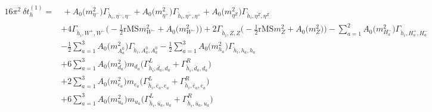 \begin{align} 
16\pi^2 \ \delta t^{(1)}_{h} = & \, +{A_0\Big(m^2_{\eta^-}\Big)} {\Gamma_{\check{h}_{{i}},\bar{\eta^-},\eta^-}} +{A_0\Big(m^2_{\eta^+}\Big)} {\Gamma_{\check{h}_{{i}},\bar{\eta^+},\eta^+}} +{A_0\Big(m^2_{\eta^Z}\Big)} {\Gamma_{\check{h}_{{i}},\bar{\eta^Z},\eta^Z}} \nonumber \\ 
 &+4 {\Gamma_{\check{h}_{{i}},W^+,W^-}} \Big(-\frac{1}{2} \text{rMS} m^2_{W^-}  + {A_0\Big(m^2_{W^-}\Big)}\Big)+2 {\Gamma_{\check{h}_{{i}},Z,Z}} \Big(-\frac{1}{2} \text{rMS} m^2_{Z}  + {A_0\Big(m^2_{Z}\Big)}\Big)- \sum_{a=1}^{2}{A_0\Big(m^2_{H^-_{{a}}}\Big)} {\Gamma_{\check{h}_{{i}},H^+_{{a}},H^-_{{a}}}}  \nonumber \\ 
 &-\frac{1}{2} \sum_{a=1}^{3}{A_0\Big(m^2_{A^0_{{a}}}\Big)} {\Gamma_{\check{h}_{{i}},A^0_{{a}},A^0_{{a}}}}  -\frac{1}{2} \sum_{a=1}^{3}{A_0\Big(m^2_{h_{{a}}}\Big)} {\Gamma_{\check{h}_{{i}},h_{{a}},h_{{a}}}}  \nonumber \\ 
 &+6 \sum_{a=1}^{3}{A_0\Big(m^2_{d_{{a}}}\Big)} m_{d_{{a}}} \Big({\Gamma^L_{\check{h}_{{i}},\bar{d}_{{a}},d_{{a}}}} + {\Gamma^R_{\check{h}_{{i}},\bar{d}_{{a}},d_{{a}}}}\Big) \nonumber \\ 
 &+2 \sum_{a=1}^{3}{A_0\Big(m^2_{e_{{a}}}\Big)} m_{e_{{a}}} \Big({\Gamma^L_{\check{h}_{{i}},\bar{e}_{{a}},e_{{a}}}} + {\Gamma^R_{\check{h}_{{i}},\bar{e}_{{a}},e_{{a}}}}\Big) \nonumber \\ 
 &+6 \sum_{a=1}^{3}{A_0\Big(m^2_{u_{{a}}}\Big)} m_{u_{{a}}} \Big({\Gamma^L_{\check{h}_{{i}},\bar{u}_{{a}},u_{{a}}}} + {\Gamma^R_{\check{h}_{{i}},\bar{u}_{{a}},u_{{a}}}}\Big)  
\end{align} 
